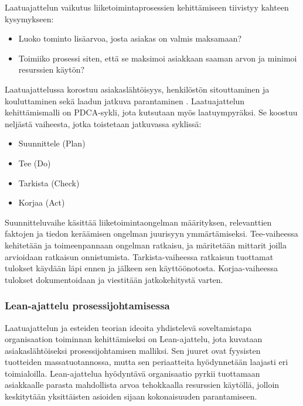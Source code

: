 \documentclass[finnish,12pt,a4paper,pdftex]{article}
\begin{document}
Laatuajattelun vaikutus liiketoimintaprosessien kehittämiseen tiivistyy kahteen kysymykseen:
\begin{itemize}
\setlength{\itemsep}{0pt}
    \item Luoko tominto lisäarvoa, josta asiakas on valmis maksamaan?
    \item Toimiiko prosessi siten, että se maksimoi asiakkaan saaman arvon ja minimoi resurssien käytön?
\end{itemize}

Laatuajattelussa korostuu asiakaslähtöisyys, henkilöstön sitouttaminen ja kouluttaminen sekä laadun jatkuva parantaminen \citep{teollisuustalous}. Laatuajattelun kehittämismalli on PDCA-sykli, jota kutsutaan myös laatuympyräksi. Se koostuu neljästä vaiheesta, jotka toistetaan jatkuvassa syklissä: \\

\begin{itemize}
\setlength{\itemsep}{0pt}
    \item Suunnittele (Plan)
    \item Tee (Do)
    \item Tarkista (Check)
    \item Korjaa (Act)
\end{itemize}

Suunnitteluvaihe käsittää liiketoimintaongelman määrityksen, relevanttien faktojen ja tiedon keräämisen ongelman juurisyyn ymmärtämiseksi. Tee-vaiheessa kehitetään ja toimeenpannaan ongelman ratkaisu, ja märitetään mittarit joilla arvioidaan ratkaisun onnistumista. Tarkista-vaiheessa ratkaisun tuottamat tulokset käydään läpi ennen ja jälkeen sen käyttöönotosta. Korjaa-vaiheessa tulokset dokumentoidaan ja viestitään jatkokehitystä varten. \citep{mohapatra}

\subsubsection{Lean-ajattelu prosessijohtamisessa}

Laatuajattelun ja esteiden teorian ideoita yhdistelevä soveltamistapa organisaation toiminnan kehittämiseksi on Lean-ajattelu, jota kuvataan asiakaslähtöiseksi prosessijohtamisen malliksi. Sen juuret ovat fyysisten tuotteiden massatuotannossa, mutta sen periaatteita hyödynnetään laajasti eri toimialoilla. Lean-ajattelua hyödyntävä organisaatio pyrkii tuottamaan asiakkaalle parasta mahdollista arvoa tehokkaalla resurssien käytöllä, jolloin keskitytään yksittäisten asioiden sijaan kokonaisuuden parantamiseen. \citep{leanit}\\
\end{document}

